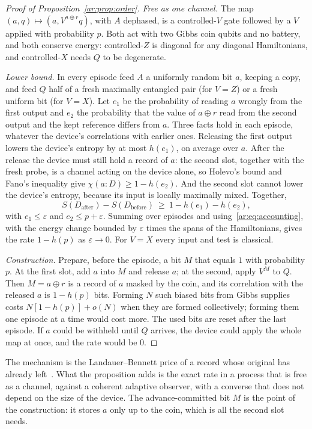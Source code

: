 \begin{proof}[Proof of Proposition~\ref{ar:prop:order}]
\emph{Free as one channel.} The map $(a,q)\mapsto(a,V^{a\oplus r}q)$, with $A$ dephased, is a controlled-$V$ gate followed by a $V$ applied with probability $p$. Both act with two Gibbs coin qubits and no battery, and both conserve energy: controlled-$Z$ is diagonal for any diagonal Hamiltonians, and controlled-$X$ needs $Q$ to be degenerate.

\emph{Lower bound.} In every episode feed $A$ a uniformly random bit $a$, keeping a copy, and feed $Q$ half of a fresh maximally entangled pair (for $V=Z$) or a fresh uniform bit (for $V=X$). Let $e_1$ be the probability of reading $a$ wrongly from the first output and $e_2$ the probability that the value of $a\oplus r$ read from the second output and the kept reference differs from $a$. Three facts hold in each episode, whatever the device's correlations with earlier ones. Releasing the first output lowers the device's entropy by at most $h(e_1)$, on average over $a$. After the release the device must still hold a record of $a$: the second slot, together with the fresh probe, is a channel acting on the device alone, so Holevo's bound and Fano's inequality give $\chi(a{:}D)\ge1-h(e_2)$. And the second slot cannot lower the device's entropy, because its input is locally maximally mixed. Together,
\[
S(D_{\mathrm{after}})-S(D_{\mathrm{before}})\ \ge\ 1-h(e_1)-h(e_2),
\]
with $e_1\le\varepsilon$ and $e_2\le p+\varepsilon$. Summing over episodes and using~\eqref{ar:eq:accounting}, with the energy change bounded by $\varepsilon$ times the spans of the Hamiltonians, gives the rate $1-h(p)$ as $\varepsilon\to0$. For $V=X$ every input and test is classical.

\emph{Construction.} Prepare, before the episode, a bit $M$ that equals $1$ with probability $p$. At the first slot, add $a$ into $M$ and release $a$; at the second, apply $V^M$ to $Q$. Then $M=a\oplus r$ is a record of $a$ masked by the coin, and its correlation with the released $a$ is $1-h(p)$ bits. Forming $N$ such biased bits from Gibbs supplies costs $N[1-h(p)]+o(N)$ when they are formed collectively; forming them one episode at a time would cost more. The used bits are reset after the last episode. If $a$ could be withheld until $Q$ arrives, the device could apply the whole map at once, and the rate would be $0$.
\end{proof}

The mechanism is the Landauer--Bennett price of a record whose original has already left~\cite{Bennett73,BMC18}. What the proposition adds is the exact rate in a process that is free as a channel, against a coherent adaptive observer, with a converse that does not depend on the size of the device. The advance-committed bit $M$ is the point of the construction: it stores $a$ only up to the coin, which is all the second slot needs.

